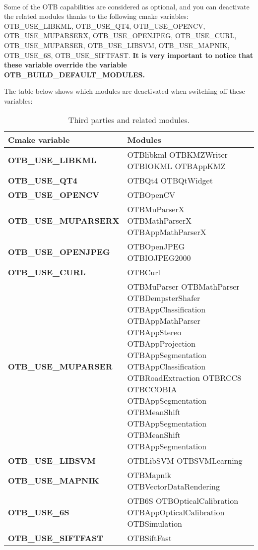 ~ 

Some of the OTB capabilities are considered as optional, and you can deactivate the related modules thanks to the following cmake variables:
OTB\_USE\_LIBKML, OTB\_USE\_QT4, OTB\_USE\_OPENCV, OTB\_USE\_MUPARSERX, OTB\_USE\_OPENJPEG, OTB\_USE\_CURL, OTB\_USE\_MUPARSER, OTB\_USE\_LIBSVM, OTB\_USE\_MAPNIK, OTB\_USE\_6S, OTB\_USE\_SIFTFAST.
\textbf{It is very important to notice that these variable override the variable OTB\_BUILD\_DEFAULT\_MODULES.}

The table below shows which modules are deactivated when switching off these variables:

\begin{center}
\begin{tiny}
\begin{table}[!htbp]
\begin{tabular}{|p{}|p{}|}
\hline
\textbf{Cmake variable} & \textbf{Modules} \\
\hline
\textbf{OTB\_USE\_LIBKML} & OTBlibkml OTBKMZWriter OTBIOKML OTBAppKMZ \\
\hline
\textbf{OTB\_USE\_QT4} & OTBQt4 OTBQtWidget \\
\hline
\textbf{OTB\_USE\_OPENCV} & OTBOpenCV \\
\hline
\textbf{OTB\_USE\_MUPARSERX} & OTBMuParserX OTBMathParserX OTBAppMathParserX \\
\hline
\textbf{OTB\_USE\_OPENJPEG} & OTBOpenJPEG OTBIOJPEG2000 \\
\hline
\textbf{OTB\_USE\_CURL} & OTBCurl \\
\hline
\textbf{OTB\_USE\_MUPARSER} & OTBMuParser OTBMathParser OTBDempsterShafer OTBAppClassification OTBAppMathParser OTBAppStereo OTBAppProjection OTBAppSegmentation OTBAppClassification OTBRoadExtraction OTBRCC8 OTBCCOBIA OTBAppSegmentation OTBMeanShift OTBAppSegmentation OTBMeanShift OTBAppSegmentation \\
\hline
\textbf{OTB\_USE\_LIBSVM} & OTBLibSVM OTBSVMLearning \\
\hline
\textbf{OTB\_USE\_MAPNIK} & OTBMapnik OTBVectorDataRendering \\
\hline
\textbf{OTB\_USE\_6S} & OTB6S OTBOpticalCalibration OTBAppOpticalCalibration OTBSimulation \\
\hline
\textbf{OTB\_USE\_SIFTFAST} & OTBSiftFast \\
\hline
\end{tabular}
\caption{Third parties and related modules.}
\label{tab:optional}
\end{table}
\end{tiny}
\end{center}

